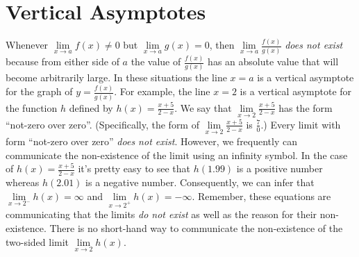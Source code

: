 \documentclass[12pt,]{book}
\theoremstyle{plain}
\theoremstyle{definition}
\numberwithin{equation}{section}
\newcommand{\fe}[2]{#1\mathopen{}\left(#2\right)\mathclose{}}
\begin{document}
\section[Vertical Asymptotes]{Vertical Asymptotes}\label{section-vertical-asymptotes}
Whenever \(\lim\limits_{x\to a}\fe{f}{x}\neq0\) but \(\lim\limits_{x\to a}\fe{g}{x}=0\), then \(\lim\limits_{x\to a}\frac{\fe{f}{x}}{\fe{g}{x}}\) \emph{does not exist} because from either side of \(a\) the value of \(\frac{\fe{f}{x}}{\fe{g}{x}}\) has an absolute value that will become arbitrarily large. In these situations the line \(x=a\) is a vertical asymptote for the graph of \(y=\frac{\fe{f}{x}}{\fe{g}{x}}\). For example, the line \(x=2\) is a vertical asymptote for the function \(h\) defined by \(\fe{h}{x}=\frac{x+5}{2-x}\). We say that \(\lim\limits_{x\to 2}\frac{x+5}{2-x}\) has the form ``not-zero over zero''. (Specifically, the form of \(\lim\limits_{x\to 2}\frac{x+5}{2-x}\) is \(\frac{7}{0}\).) Every limit with form ``not-zero over zero'' \emph{does not exist}. However, we frequently can communicate the non-existence of the limit using an infinity symbol. In the case of \(\fe{h}{x}=\frac{x+5}{2-x}\) it's pretty easy to see that \(\fe{h}{1.99}\) is a positive number whereas \(\fe{h}{2.01}\) is a negative number. Consequently, we can infer that \(\lim\limits_{x\to 2^{-}}\fe{h}{x}=\infty\) and \(\lim\limits_{x\to 2^{+}}\fe{h}{x}=-\infty\). Remember, these equations are communicating that the limits \emph{do not exist} as well as the reason for their non-existence. There is no short-hand way to communicate the non-existence of the two-sided limit \(\lim\limits_{x\to 2}\fe{h}{x}\).%
\typeout{************************************************}
\typeout{************************************************}
\end{document}
